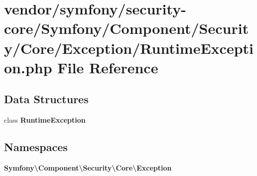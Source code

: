\section{vendor/symfony/security-\/core/\+Symfony/\+Component/\+Security/\+Core/\+Exception/\+Runtime\+Exception.php File Reference}
\label{symfony_2security-core_2_symfony_2_component_2_security_2_core_2_exception_2_runtime_exception_8php}
\subsection*{Data Structures}
\begin{DoxyCompactItemize}
\item 
class {\bf Runtime\+Exception}
\end{DoxyCompactItemize}
\subsection*{Namespaces}
\begin{DoxyCompactItemize}
\item 
 {\bf Symfony\textbackslash{}\+Component\textbackslash{}\+Security\textbackslash{}\+Core\textbackslash{}\+Exception}
\end{DoxyCompactItemize}
